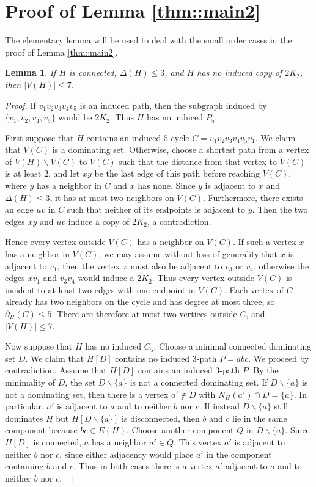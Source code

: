 \documentclass[11pt]{article}
\newtheorem{lem}[thm]{Lemma}
\theoremstyle{definition}
\begin{document}
\section{Proof of Lemma \ref{thm::main2}}

The  elementary lemma will be used to deal with the small order cases in the proof of Lemma \ref{thm::main2}.

\begin{lem}\label{lem::5}
  If $H$ is connected, $\Delta(H)\leq 3$, and $H$ has no induced copy of $2K_2$, then $|V(H)|\leq 7$.
\end{lem}

\begin{proof}
  If $v_1v_2v_3v_4v_5$ is an induced path, then the subgraph induced by $\{v_1,v_2,v_4,v_5\}$ would be $2K_2$. Thus $H$ has no induced $P_5$.

  First suppose that $H$ contains an induced $5$-cycle $C=v_1v_2v_3v_4v_5v_1$. We claim that $V(C)$ is a dominating set. Otherwise, choose a shortest path from a vertex of $V(H) \backslash V(C)$ to $V(C)$ such that the distance from that vertex to $V(C)$ is at least $2$, and let $xy$ be the last edge of this path before reaching $V(C)$, where $y$ has a neighbor in $C$ and $x$ has none. Since $y$ is adjacent to $x$ and $\Delta(H)\le3$, it has at most two neighbors on $V(C)$. Furthermore, there exists an edge $uv$ in $C$ such that  neither of its endpoints is adjacent to $y$. Then the two edges $xy$ and $uv$ induce a copy of $2K_2$, a contradiction.

  Hence every vertex outside $V(C)$ has a neighbor on $V(C)$. If such a vertex $x$ has a neighbor in $V(C)$, we may assume without loss of generality that $x$ is adjacent to $v_1$, then the vertex $x$ must also be adjacent to $v_{3}$ or $v_{4}$, otherwise the edges $xv_1$ and $v_{3}v_{4}$ would induce a $2K_2$. Thus every vertex outside $V(C)$ is incident to at least two edges with one endpoint in $V(C)$. Each vertex of $C$ already has two neighbors on the cycle and has degree at most three, so $\partial_{H}(C) \le 5$. There are therefore at most two vertices outside $C$, and $|V(H)|\le7$.

  Now suppose that $H$ has no induced $C_5$. Choose a minimal connected dominating set $D$. We claim that $H[D]$ contains no induced $3$-path $P=abc$. We proceed by contradiction. Assume that $H[D]$ contains an induced $3$-path $P$. By the minimality of $D$, the set $D\backslash\{a\}$ is not a connected dominating set. If $D\backslash\{a\}$ is not a dominating set, then there is a vertex $a'\notin D$ with $N_H(a')\cap D=\{a\}$. In particular, $a'$ is adjacent to $a$ and to neither $b$ nor $c$. If instead $D\backslash\{a\}$ still dominates $H$ but $H[D\backslash\{a\}]$ is disconnected, then $b$ and $c$ lie in the same component because $bc\in E(H)$. Choose another component $Q$ in $D\backslash\{a\}$. Since $H[D]$ is connected, $a$ has a neighbor $a'\in Q$. This vertex $a'$ is adjacent to neither $b$ nor $c$, since either adjacency would place $a'$ in the component containing $b$ and $c$. Thus in both cases there is a vertex $a'$ adjacent to $a$ and to neither $b$ nor $c$.


\end{proof}
\end{document}
